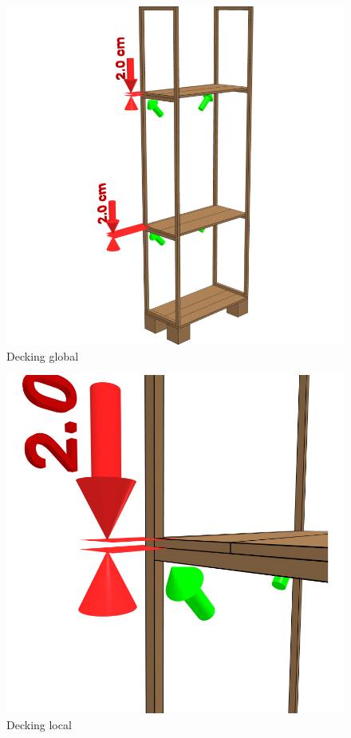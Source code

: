 \documentclass{article}
\begin{document}
\begin{figure}[h!]
    \centering
    \includegraphics[width=\textwidth]{scene 6 - vlonders a.png}
    \caption{Decking global}
\end{figure}

\begin{figure}[h!]
    \centering
    \includegraphics[width=\textwidth]{scene 6 - vlonders b.png}
    \caption{Decking local}
\end{figure}
\end{document}
